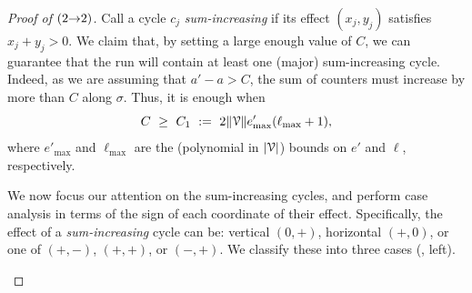 \begin{proof}[Proof of  $({2}{\rightarrow}{2})$]
Call a cycle $c_j$ \emph{sum-increasing} if its effect $(x_j, y_j)$ satisfies $x_j + y_j > 0$.
We claim that, by setting a large enough value of $C$, we can guarantee that the run
will contain at least one (major) sum-increasing cycle.
% 
Indeed, as we are assuming that $a' - a > C$, the sum of counters
must increase by more than $C$ along $\sigma$.
Thus, it is enough when
\[
    C \ \geq \ C_1 \ := \ 
    2\norm\V e'_\mathrm{max} (\ell_\mathrm{max} + 1),
\]
where $e'_\mathrm{max}$ and $\ell_\mathrm{max}$ are the 
(polynomial in $|\mathcal{V}|$) bounds
on $e'$ and $\ell$, respectively.

We now focus our attention on the sum-increasing cycles, and perform
case analysis in terms of the sign of each coordinate of their effect.
Specifically, the effect of a \emph{sum-increasing} cycle can be:
vertical $(0,+)$, horizontal $(+,0)$, or one of $(+,-)$, $(+,+)$, or $(-,+)$.
We classify these into three cases (\Cref{fig:cases}, left).

\begin{figure}[h]
\centering
{}
\end{figure}
\end{proof}
